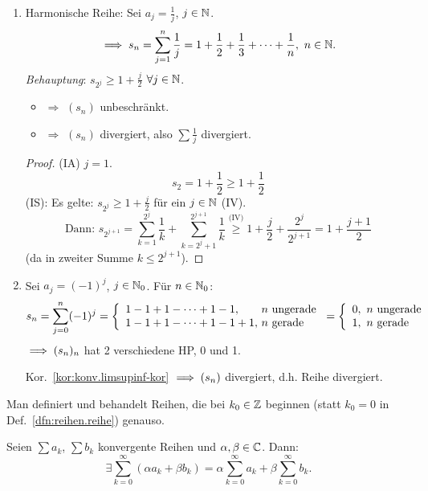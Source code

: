 \documentclass[12pt]{scrreprt}
\begin{document}
\begin{bsp}
\begin{enumerate}
  \item Harmonische Reihe: Sei $\displaystyle a_j = \frac{1}{j}$, $j\in\mathbb{N}$.
  \[\folgt s_n = \sum^n_{j=1}\frac{1}{j}=1+\frac{1}{2}+\frac{1}{3}+\dotsb+\frac{1}{n},\ \nat{n}.\]
  \emph{Behauptung}: $\displaystyle s_{2^j}\geq 1+\frac{j}{2}$ $\forall j\in\mathbb{N}$.\begin{itemize}
  	\item[]$\Rightarrow$ $(s_n)$ unbeschränkt.
	\item[]$\Rightarrow$ $(s_n)$ divergiert, also $\displaystyle\sum\frac{1}{j}$ divergiert.
  \end{itemize}\begin{proof}(IA) $j=1$.
  \[s_2 = 1+\frac{1}{2}\geq 1+\frac{1}{2}\]
  (IS): Es gelte: $\displaystyle s_{2^j}\geq 1+\frac{j}{2}$ für ein $j\in\mathbb{N}$ (IV).
  \[\text{Dann: } s_{2^{j+1}} = \sum^{2^j}_{k=1}\frac{1}{k}+\sum^{2^{j+1}}_{k=2^j+1}\frac{1}{k} \stackrel{\text{(IV)}}{\geq} 1+\frac{j}{2}+\frac{2^j}{2^{j+1}}=1+\frac{j+1}{2}\]
  (da in zweiter Summe $k\leq 2^{j+1}$).\end{proof}
  
  \item\label{bsp:reihen.reihe-e} Sei $a_j = (-1)^j$, $j\in\mathbb{N}_0$. Für $n\in\mathbb{N}_0$:
  \[s_n = \sum^n_{j=0}(-1)^j = \left\{\begin{array}{l @{\ } l}1-1+1-\dotsb+1-1,&n\ \text{ungerade}\\1-1+1-\dotsb+1-1+1,&n\ \text{gerade}\end{array}\right. = \left\{\begin{array}{l @{,\ n\ } l}0&\text{ungerade}\\1&\text{gerade}\end{array}\right.\]
  $\implies (s_n)_n$ hat 2 verschiedene HP, 0 und 1.
  
  Kor.~\ref{kor:konv.limsupinf-kor} $\implies (s_n)$ divergiert, d.h. Reihe divergiert.
  \end{enumerate}
\end{bsp}

\begin{bem*} Man definiert und behandelt Reihen, die bei $k_0\in\mathbb{Z}$ beginnen (statt $k_0 = 0$ in Def.~\ref{dfn:reihen.reihe}) genauso.
\end{bem*}

\begin{satz}
  \label{satz:reihen.addit-reihenwerte}
  Seien $\sum a_k$, $\sum b_k$ konvergente Reihen und $\alpha,\beta\in\mathbb{C}$. Dann:
  \[\exists\sum^\infty_{k=0}(\alpha a_k + \beta b_k) = \alpha\sum^\infty_{k=0}a_k+\beta\sum^\infty_{k=0}b_k.\]
\end{satz}
\end{document}
